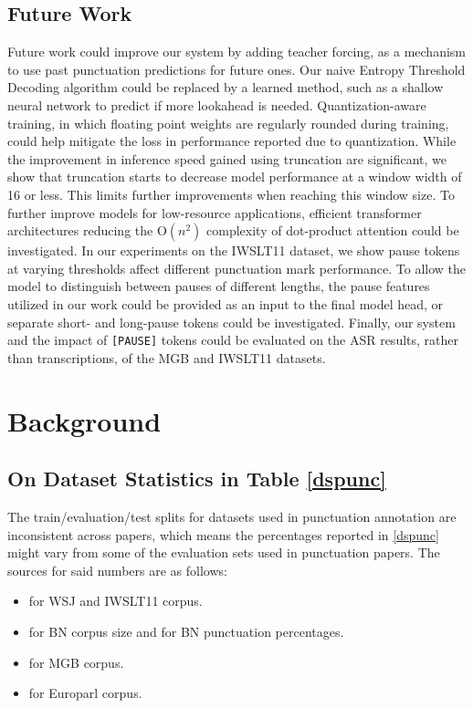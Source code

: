 \documentclass[bsc,deptreport,ai]{infthesis} %
\begin{document}
\section{Future Work}
Future work could improve our system by adding teacher forcing, as a mechanism to use past punctuation predictions for future ones. Our naive Entropy Threshold Decoding algorithm could be replaced by a learned method, such as a shallow neural network to predict if more lookahead is needed. Quantization-aware training, in which floating point weights are regularly rounded during training, could help mitigate the loss in performance reported due to quantization.
While the improvement in inference speed gained using truncation are significant, we show that truncation starts to decrease model performance at a window width of 16 or less. This limits further improvements when reaching this window size. To further improve models for low-resource applications, efficient transformer architectures reducing the $\mathrm{O}(n^2)$ complexity of dot-product attention could be investigated. In our experiments on the IWSLT11 dataset, we show pause tokens at varying thresholds affect different punctuation mark performance. To allow the model to distinguish between pauses of different lengths, the pause features utilized in our work could be provided as an input to the final model head, or separate short- and long-pause tokens could be investigated. Finally, our system and the impact of \texttt{[PAUSE]} tokens could be evaluated on the ASR results, rather than transcriptions, of the MGB and IWSLT11 datasets.



\appendix
{}
\chapter{Background}
 
\section{On Dataset Statistics in Table \ref{dspunc}}
\label{appendixds}
The train/evaluation/test splits for datasets used in punctuation annotation are inconsistent across papers, which means the percentages reported in \ref{dspunc} might vary from some of the evaluation sets used in punctuation papers. The sources for said numbers are as follows:
\begin{itemize}
    \item \citet{Ueffing2013} for WSJ and IWSLT11 corpus.
    \item \citet{kim2003} for BN corpus size and \citet{batista2008} for BN punctuation percentages.
    \item \citet{Klejch2016} for MGB corpus.
    \item \citet{europarl} for Europarl corpus.
\end{itemize}
\end{document}
